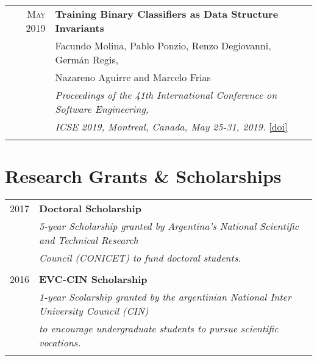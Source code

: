 \documentclass[a4paper,10pt]{article} %
\begin{document}
\begin{longtable}{rl}
\textsc{May} 2019  & \textbf{Training Binary Classifiers as Data Structure Invariants} \\ 
& Facundo Molina, Pablo Ponzio, Renzo Degiovanni, Germán Regis, \\ 
& Nazareno Aguirre and Marcelo Frias \\
& \textit{Proceedings of the 41th International Conference on Software Engineering,} \\
& \textit{ICSE 2019, Montreal, Canada, May 25-31, 2019.} \href{https://doi.ieeecomputersociety.org/10.1109/ICSE.2019.00084}{[doi]} \\ & \\

\end{longtable}

\section{Research Grants \& Scholarships}
\begin{longtable}{rl}

2017 & \textbf{Doctoral Scholarship} \\ 
& \textit{5-year Scholarship granted by Argentina's National Scientific and Technical Research} \\
& \textit{Council (CONICET) to fund doctoral students.} \\ & \\

2016 & \textbf{EVC-CIN Scholarship} \\ 
& \textit{1-year Scolarship granted by the argentinian National Inter University Council (CIN)} \\
& \textit{to encourage undergraduate students to pursue scientific vocations.} \\ & \\

\end{longtable}
\end{document}
